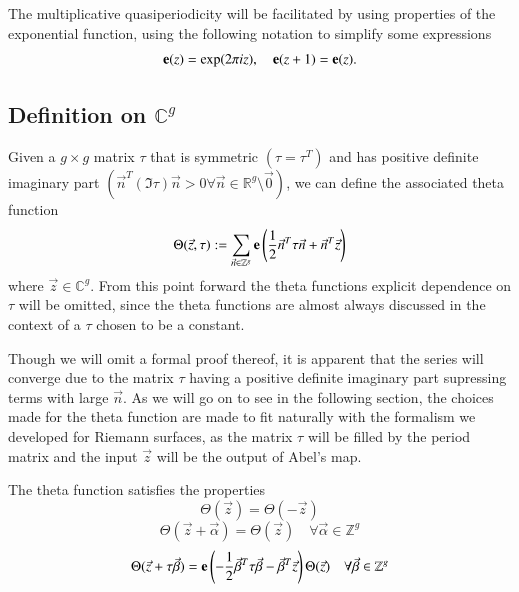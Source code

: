 The multiplicative quasiperiodicity will be facilitated by using properties of the exponential function, using the following notation to simplify some expressions
\begin{equation}
    \mathbf{e}(z) = \exp(2\pi i z), \quad \mathbf{e}(z+1)=\mathbf{e}(z).
\end{equation}

\subsection{Definition on $\mathbb C^g$}

\begin{definition}
    Given a $g \times g$ matrix $\tau$ that is symmetric $(\tau = \tau^T)$ and has positive definite imaginary part $(\vec n^T (\Im \tau) \vec n > 0 \forall \vec n \in \mathbb R^g \setminus \vec 0)$, we can define the associated theta function
    \begin{equation} \label{eqnB12:thetaGeneralDefn}
        \Theta(\vec z,\tau) := \sum_{\vec n \in \mathbb Z^g} \mathbf{e}\left(\frac{1}{2} \vec n^T \tau \vec n + \vec n^T \vec z\right)
    \end{equation}
    where $\vec z \in \mathbb C^g$. From this point forward the theta functions explicit dependence on $\tau$ will be omitted, since the theta functions are almost always discussed in the context of a $\tau$ chosen to be a constant.
\end{definition}

Though we will omit a formal proof thereof, it is apparent that the series will converge due to the matrix $\tau$ having a positive definite imaginary part supressing terms with large $\vec n$. As we will go on to see in the following section, the choices made for the theta function are made to fit naturally with the formalism we developed for Riemann surfaces, as the matrix $\tau$ will be filled by the period matrix and the input $\vec z$ will be the output of Abel's map.

\begin{lemma}
    \label{lemmaB12:thetaGeneralProperties}
    The theta function satisfies the properties
    \begin{equation} \label{eqnB12:thetaGeneralEven}
        \Theta(\vec z) = \Theta(-\vec z)
    \end{equation}
    \begin{equation} \label{eqnB12:thetaGeneralShift}
        \Theta(\vec z+\vec \alpha) = \Theta(\vec z) \quad \forall \vec \alpha \in \mathbb Z^g
    \end{equation}
    \begin{equation} \label{eqnB12:thetaGeneralTauShift}
        \Theta(\vec z + \tau \vec \beta) = \mathbf{e}\left(-\frac{1}{2}\vec \beta^T \tau \vec \beta - \vec \beta^T \vec z\right) \Theta(\vec z) \quad \forall \vec \beta \in \mathbb Z^g
    \end{equation}
\end{lemma}

